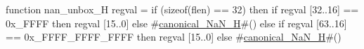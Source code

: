function nan_unbox_H   regval =
  if (sizeof(flen) == 32)
  then if regval [32..16] == 0x_FFFF
       then regval [15..0]
       else #\hyperref[sailRISCVzcanonicalzyNaNzyH]{canonical\_NaN\_H}#()
  else if regval [63..16] == 0x_FFFF_FFFF_FFFF
       then regval [15..0]
       else #\hyperref[sailRISCVzcanonicalzyNaNzyH]{canonical\_NaN\_H}#()
